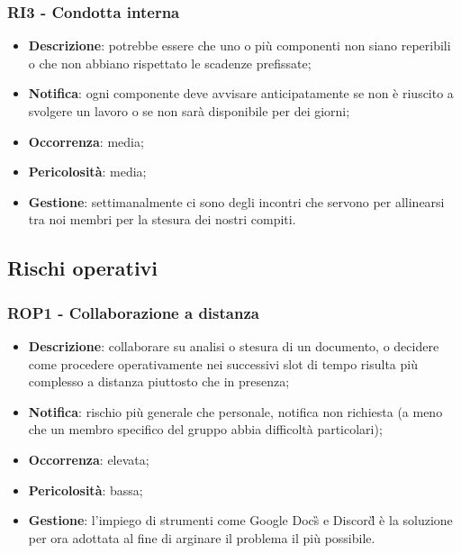 	\subsubsection*{RI3 - Condotta interna}
	\begin{itemize}
		\item \textbf{Descrizione}: potrebbe essere che uno o più componenti non siano reperibili o che non abbiano rispettato le scadenze prefissate;
		\item \textbf{Notifica}: ogni componente deve avvisare anticipatamente se non è riuscito a svolgere un lavoro o se non sarà disponibile per dei giorni;
		\item \textbf{Occorrenza}: media;
		\item \textbf{Pericolosità}: media;
		\item \textbf{Gestione}: settimanalmente ci sono degli incontri che servono per allinearsi tra noi membri per la stesura dei nostri compiti.
	\end{itemize}

   \subsection{Rischi operativi}
  
  	\subsubsection*{ROP1 - Collaborazione a distanza}
  	\begin{itemize}
  		\item \textbf{Descrizione}: collaborare su analisi o stesura di un documento, o decidere come procedere operativamente nei successivi slot di tempo risulta più complesso a distanza piuttosto che in presenza;
  		\item \textbf{Notifica}: rischio più generale che personale, notifica non richiesta (a meno che un membro specifico del gruppo abbia difficoltà particolari);
  		\item \textbf{Occorrenza}: elevata;
  		\item \textbf{Pericolosità}: bassa;
  		\item \textbf{Gestione}: l'impiego di strumenti come Google Docs\G{} e Discord\G{} è la soluzione per ora adottata al fine di arginare il problema il più possibile.
  	\end{itemize}